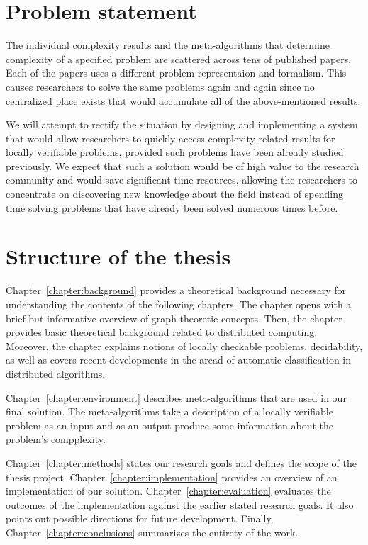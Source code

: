 \section{Problem statement}

The individual complexity results and the meta-algorithms
that determine complexity of a specified problem are
scattered across tens of published papers. Each of the
papers uses a different problem representaion and
formalism. This causes researchers to solve
the same problems again and again since no
centralized place exists that would accumulate all of the
above-mentioned results.

We will attempt to rectify the
situation by designing and implementing a system
that would allow researchers to quickly
access complexity-related results for locally
verifiable problems, provided such problems have been
already studied
previously. We expect that such a solution
would be of high value to the research community and
would save significant time resources, allowing the researchers
to concentrate on discovering new knowledge about the
field instead of spending time solving problems that
have already been solved numerous times before.

\section{Structure of the thesis}
\label{section:structure} 

Chapter~\ref{chapter:background} provides a theoretical
background necessary for understanding the contents of the
following chapters. The chapter opens with
a brief but informative overview of graph-theoretic
concepts. Then, the chapter provides basic
theoretical background related to distributed computing.
Moreover, the chapter explains notions of
locally checkable problems, decidability, as well as
covers recent developments in the aread of
automatic classification in distributed algorithms.

Chapter~\ref{chapter:environment} describes
meta-algorithms that are used in our final
solution. The meta-algorithms take a description
of a locally verifiable problem as an input and
as an output produce some information about the
problem's compplexity.

Chapter~\ref{chapter:methods} states our research goals
and defines the scope of the thesis project.
Chapter~\ref{chapter:implementation}
provides an overview of an implementation of
our solution. Chapter~\ref{chapter:evaluation}
evaluates the outcomes of the implementation
against the earlier stated research goals. It
also points out possible directions for
future development. Finally, Chapter~\ref{chapter:conclusions}
summarizes the entirety of the work.
